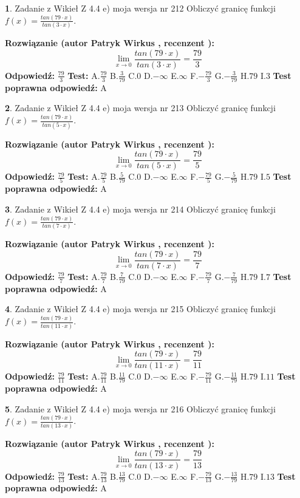 \documentclass[12pt, a4paper]{article}
\theoremstyle{definition} %
\newtheorem{zad}{}
\newcommand{\zadStart}[1]{\begin{zad}#1\newline}
\newcommand{\zadStop}{\end{zad}}
\newcommand{\rozwStart}[2]{\noindent \textbf{Rozwiązanie (autor #1 , recenzent #2): }\newline}
\newcommand{\rozwStop}{\newline}
\newcommand{\odpStart}{\noindent \textbf{Odpowiedź:}\newline}
\newcommand{\odpStop}{\newline}
\newcommand{\testStart}{\noindent \textbf{Test:}\newline}
\newcommand{\testStop}{\newline}
\newcommand{\kluczStart}{\noindent \textbf{Test poprawna odpowiedź:}\newline}
\newcommand{\kluczStop}{\newline}
\begin{document}
\zadStart{Zadanie z Wikieł Z 4.4 e) moja wersja nr 212}
Obliczyć granicę funkcji $f(x)=\frac{tan(79\cdot x)}{tan(3\cdot x)}$.
\zadStop
\rozwStart{Patryk Wirkus}{}
$$\lim\limits_{x\to 0}\frac{tan(79\cdot x)}{tan(3\cdot x)}=
\frac{79}{3}$$
\rozwStop
\odpStart
$\frac{79}{3}$
\odpStop
\testStart
A.$\frac{79}{3}$
B.$\frac{3}{79}$
C.$0$
D.$-\infty$
E.$\infty$
F.$-\frac{79}{3}$
G.$-\frac{3}{79}$
H.$79$
I.$3$
\testStop
\kluczStart
A
\kluczStop



\zadStart{Zadanie z Wikieł Z 4.4 e) moja wersja nr 213}
Obliczyć granicę funkcji $f(x)=\frac{tan(79\cdot x)}{tan(5\cdot x)}$.
\zadStop
\rozwStart{Patryk Wirkus}{}
$$\lim\limits_{x\to 0}\frac{tan(79\cdot x)}{tan(5\cdot x)}=
\frac{79}{5}$$
\rozwStop
\odpStart
$\frac{79}{5}$
\odpStop
\testStart
A.$\frac{79}{5}$
B.$\frac{5}{79}$
C.$0$
D.$-\infty$
E.$\infty$
F.$-\frac{79}{5}$
G.$-\frac{5}{79}$
H.$79$
I.$5$
\testStop
\kluczStart
A
\kluczStop



\zadStart{Zadanie z Wikieł Z 4.4 e) moja wersja nr 214}
Obliczyć granicę funkcji $f(x)=\frac{tan(79\cdot x)}{tan(7\cdot x)}$.
\zadStop
\rozwStart{Patryk Wirkus}{}
$$\lim\limits_{x\to 0}\frac{tan(79\cdot x)}{tan(7\cdot x)}=
\frac{79}{7}$$
\rozwStop
\odpStart
$\frac{79}{7}$
\odpStop
\testStart
A.$\frac{79}{7}$
B.$\frac{7}{79}$
C.$0$
D.$-\infty$
E.$\infty$
F.$-\frac{79}{7}$
G.$-\frac{7}{79}$
H.$79$
I.$7$
\testStop
\kluczStart
A
\kluczStop



\zadStart{Zadanie z Wikieł Z 4.4 e) moja wersja nr 215}
Obliczyć granicę funkcji $f(x)=\frac{tan(79\cdot x)}{tan(11\cdot x)}$.
\zadStop
\rozwStart{Patryk Wirkus}{}
$$\lim\limits_{x\to 0}\frac{tan(79\cdot x)}{tan(11\cdot x)}=
\frac{79}{11}$$
\rozwStop
\odpStart
$\frac{79}{11}$
\odpStop
\testStart
A.$\frac{79}{11}$
B.$\frac{11}{79}$
C.$0$
D.$-\infty$
E.$\infty$
F.$-\frac{79}{11}$
G.$-\frac{11}{79}$
H.$79$
I.$11$
\testStop
\kluczStart
A
\kluczStop



\zadStart{Zadanie z Wikieł Z 4.4 e) moja wersja nr 216}
Obliczyć granicę funkcji $f(x)=\frac{tan(79\cdot x)}{tan(13\cdot x)}$.
\zadStop
\rozwStart{Patryk Wirkus}{}
$$\lim\limits_{x\to 0}\frac{tan(79\cdot x)}{tan(13\cdot x)}=
\frac{79}{13}$$
\rozwStop
\odpStart
$\frac{79}{13}$
\odpStop
\testStart
A.$\frac{79}{13}$
B.$\frac{13}{79}$
C.$0$
D.$-\infty$
E.$\infty$
F.$-\frac{79}{13}$
G.$-\frac{13}{79}$
H.$79$
I.$13$
\testStop
\kluczStart
A
\kluczStop
\end{document}
